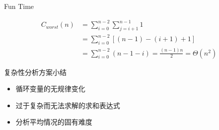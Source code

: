 \documentclass[fontset=fandol,UTF8,12pt,aspectratio=169,fleqn]{beamer}
\begin{document}
\begin{frame}{Fun Time}
  \begin{exampleblock}{}
    \begin{align*}
   C_{worst}(n) & =  \sum_{i=0}^{n-2}\sum_{j=i+1}^{n-1}1   \\
 &=  \sum_{i=0}^{n-2}[(n-1)-(i+1)+1]   \\
 & =  \sum_{i=0}^{n-2}(n-1-i) =  \frac{(n-1)n}{2}=\Theta(n^2) 
    \end{align*}
  \end{exampleblock}
\end{frame}

\begin{frame}{复杂性分析方案小结}
\begin{itemize}[<+-|alert@+>]
\item 循环变量的无规律变化
\item 过于复杂而无法求解的求和表达式
\item 分析平均情况的固有难度
\end{itemize}
\end{frame}
\end{document}
